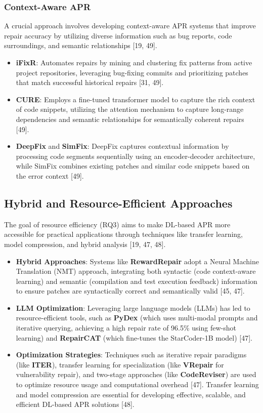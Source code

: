 \subsubsection{Context-Aware APR}
A crucial approach involves developing context-aware APR systems that improve repair accuracy by utilizing diverse information such as bug reports, code surroundings, and semantic relationships [19, 49].
\begin{itemize}
    \item \textbf{iFixR}: Automates repairs by mining and clustering fix patterns from active project repositories, leveraging bug-fixing commits and prioritizing patches that match successful historical repairs [31, 49].
    \item \textbf{CURE}: Employs a fine-tuned transformer model to capture the rich context of code snippets, utilizing the attention mechanism to capture long-range dependencies and semantic relationships for semantically coherent repairs [49].
    \item \textbf{DeepFix} and \textbf{SimFix}: DeepFix captures contextual information by processing code segments sequentially using an encoder-decoder architecture, while SimFix combines existing patches and similar code snippets based on the error context [49].
\end{itemize}

\subsection{Hybrid and Resource-Efficient Approaches}
The goal of resource efficiency (RQ3) aims to make DL-based APR more accessible for practical applications through techniques like transfer learning, model compression, and hybrid analysis [19, 47, 48].

\begin{itemize}
    \item \textbf{Hybrid Approaches}: Systems like \textbf{RewardRepair} adopt a Neural Machine Translation (NMT) approach, integrating both syntactic (code context-aware learning) and semantic (compilation and test execution feedback) information to ensure patches are syntactically correct and semantically valid [45, 47].
    \item \textbf{LLM Optimization}: Leveraging large language models (LLMs) has led to resource-efficient tools, such as \textbf{PyDex} (which uses multi-modal prompts and iterative querying, achieving a high repair rate of 96.5\% using few-shot learning) and \textbf{RepairCAT} (which fine-tunes the StarCoder-1B model) [47].
    \item \textbf{Optimization Strategies}: Techniques such as iterative repair paradigms (like \textbf{ITER}), transfer learning for specialization (like \textbf{VRepair} for vulnerability repair), and two-stage approaches (like \textbf{CodeReviser}) are used to optimize resource usage and computational overhead [47]. Transfer learning and model compression are essential for developing effective, scalable, and efficient DL-based APR solutions [48].
\end{itemize}